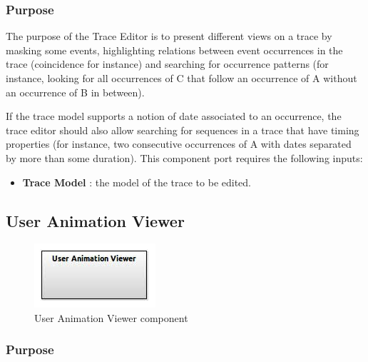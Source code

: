 \documentclass{gemoc} %
\begin{document}
\subsubsection{Purpose}
The purpose of the Trace Editor is to present different views on a trace by masking some events, highlighting relations between event occurrences in the trace (coincidence for instance) and searching for occurrence patterns (for instance, looking for all occurrences of C that follow an occurrence of A without an occurrence of B in between).

If the trace model supports a notion of date associated to an occurrence, the trace editor should also allow searching for sequences in a trace that have timing properties (for instance, two consecutive occurrences of A with dates separated by more than some duration).
This component port requires the following inputs:
\begin{itemize}
  \item \textbf{Trace Model} :
  the model of the trace to be edited.
\end{itemize}


\subsection{User Animation Viewer}

\begin{figure}[htp]
	\begin{center}
	\includegraphics*[trim=0.0cm 0.0cm 0cm 0.0cm, clip=true, scale=1.0]{../images/generated/Generated_User Animation Viewer.jpg}
	\caption{User Animation Viewer component}
	\end{center}
\end{figure}

\subsubsection{Purpose}
\end{document}
